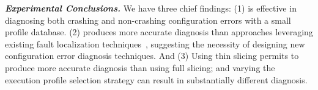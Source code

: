 

\vspace{1mm}

\noindent \textbf{\textit{Experimental Conclusions.}} 
We have three chief findings: (1) \ourtool is effective
in diagnosing both crashing and non-crashing configuration errors
with a small profile database.
(2) \ourtool produces more accurate diagnosis than
approaches leveraging existing fault localization
techniques~\cite{Jones:2002, McCamant:2003}, 
suggesting the necessity of designing new configuration error
diagnosis techniques. And (3) Using thin slicing
permits \ourtool to produce more accurate diagnosis than using
full slicing; and varying the execution profile selection
strategy can result in substantially different diagnosis.





